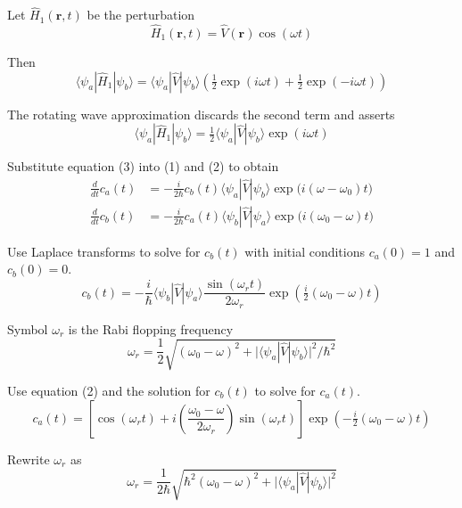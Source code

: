Let $\hat H_1(\mathbf r,t)$ be the perturbation
\begin{equation*}
\hat H_1(\mathbf r,t)=\hat V(\mathbf r)\cos(\omega t)
\end{equation*}

Then
\begin{equation*}
\langle\psi_a|\hat H_1|\psi_b\rangle
=\langle\psi_a|\hat V|\psi_b\rangle
\left(\tfrac{1}{2}\exp(i\omega t)+\tfrac{1}{2}\exp(-i\omega t)\right)
\end{equation*}

The rotating wave approximation discards the second term and asserts
\begin{equation*}
\langle\psi_a|\hat H_1|\psi_b\rangle=\tfrac{1}{2}\langle\psi_a|\hat V|\psi_b\rangle\exp(i\omega t)
\tag{3}
\end{equation*}

Substitute equation (3) into (1) and (2) to obtain
\begin{align*}
\frac{d}{dt}c_a(t)&=-\frac{i}{2\hbar}c_b(t)\langle\psi_a|\hat V|\psi_b\rangle
\exp\bigl(i(\omega-\omega_0)t\bigr)
\tag{4}
\\[1ex]
\frac{d}{dt}c_b(t)&=-\frac{i}{2\hbar}c_a(t)\langle\psi_b|\hat V|\psi_a\rangle
\exp\bigl(i(\omega_0-\omega)t\bigr)
\tag{5}
\end{align*}

Use Laplace transforms to solve for $c_b(t)$ with initial conditions $c_a(0)=1$ and $c_b(0)=0$.
\begin{equation*}
c_b(t)=-\frac{i}{\hbar}\langle\psi_b|\hat V|\psi_a\rangle
\frac{\sin(\omega_rt)}{2\omega_r}
\exp\left(\tfrac{i}{2}(\omega_0-\omega)t\right)
\tag{6}
\end{equation*}

Symbol $\omega_r$ is the Rabi flopping frequency
\begin{equation*}
\omega_r=\frac{1}{2}\sqrt{(\omega_0-\omega)^2
+\bigl|\langle\psi_a|\hat V|\psi_b\rangle\bigr|^2/\hbar^2}
\end{equation*}

Use equation (2) and the solution for $c_b(t)$ to solve for $c_a(t)$.
\begin{equation*}
c_a(t)=\left[\cos(\omega_rt)+i\left(\frac{\omega_0-\omega}{2\omega_r}\right)\sin(\omega_rt)\right]
\exp\left(-\tfrac{i}{2}(\omega_0-\omega)t\right)
\end{equation*}

Rewrite $\omega_r$ as
\begin{equation*}
\omega_r=\frac{1}{2\hbar}\sqrt{\hbar^2(\omega_0-\omega)^2
+\bigl|\langle\psi_a|\hat V|\psi_b\rangle\bigr|^2}
\end{equation*}

